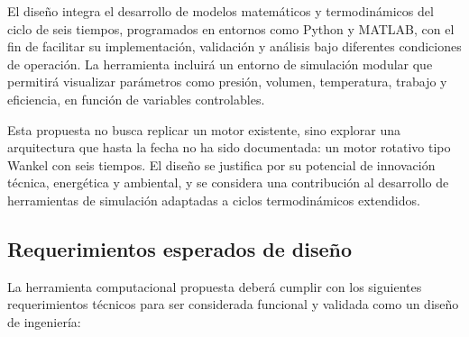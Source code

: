 \documentclass{LS}
\begin{document}
El diseño integra el desarrollo de modelos matemáticos y termodinámicos del ciclo de seis tiempos, programados en entornos como Python y MATLAB, con el fin de facilitar su implementación, validación y análisis bajo diferentes condiciones de operación. La herramienta incluirá un entorno de simulación modular que permitirá visualizar parámetros como presión, volumen, temperatura, trabajo y eficiencia, en función de variables controlables.

Esta propuesta no busca replicar un motor existente, sino explorar una arquitectura que hasta la fecha no ha sido documentada: un motor rotativo tipo Wankel con seis tiempos. El diseño se justifica por su potencial de innovación técnica, energética y ambiental, y se considera una contribución al desarrollo de herramientas de simulación adaptadas a ciclos termodinámicos extendidos.


\subsection{Requerimientos esperados de diseño}

La herramienta computacional propuesta deberá cumplir con los siguientes requerimientos técnicos para ser considerada funcional y validada como un diseño de ingeniería:
\end{document}
